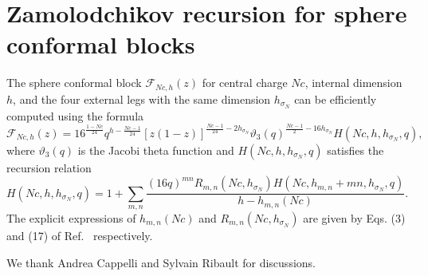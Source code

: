 \documentclass[a4paper,11pt]{article}
\begin{document}
\section{Zamolodchikov recursion for sphere conformal blocks}\label{app_zamolodchikov}
The sphere conformal block $\mathcal{F}_{Nc, h}(z)$
for central charge $Nc$, internal dimension $h$, and the four
external legs with the same dimension $h_{\sigma_N}$ can be efficiently computed 
using the formula \cite{Zamolodchikov}
\begin{equation}
 \mathcal{F}_{Nc, h}(z)=
 16^{\frac{1-Nc}{24}}q^{h-\frac{Nc-1}{24}}
 [z(1-z)]^{\frac{Nc-1}{24}-2h_{\sigma_N}}
 \vartheta_3(q)^{\frac{Nc-1}{2}-16h_{\sigma_N}}H(Nc, h, h_{\sigma_N}, q),
\end{equation}
where $\vartheta_3(q)$ is the Jacobi theta function and $H(Nc, h, h_{\sigma_N}, q)$
satisfies the recursion relation 
\begin{equation}
 H(Nc, h, h_{\sigma_N}, q)=
 1+\sum_{m, n}\frac{(16q)^{mn}R_{m,n}(Nc, h_{\sigma_N})H(Nc, h_{m,n}+mn, h_{\sigma_N}, q)}
 {h-h_{m,n}(Nc)}.
\end{equation}
The explicit expressions of $h_{m,n}(Nc)$ and $R_{m, n}(Nc, h_{\sigma_N})$
are given by Eqs. (3) and (17) of Ref.~\cite{Zamolodchikov} respectively.  


\acknowledgments
We thank Andrea Cappelli and Sylvain Ribault for discussions.





\end{document}
